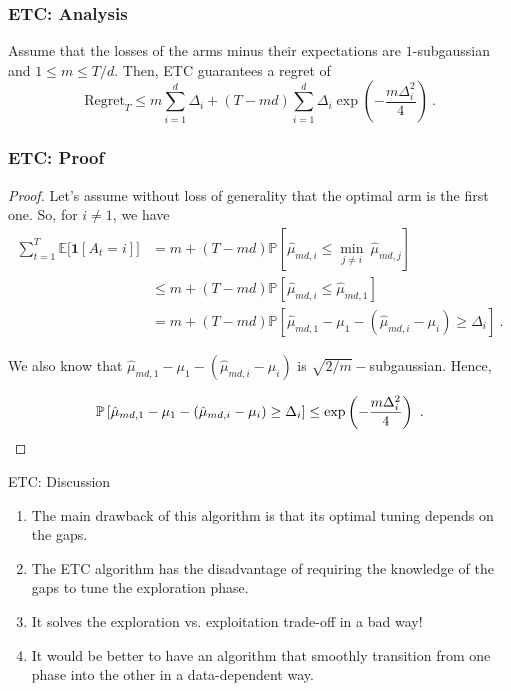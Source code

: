 \documentclass{beamer}
\begin{document}
\begin{frame}
\frametitle{ETC: Analysis}
\begin{theorem}
Assume that the losses of the arms minus their expectations are $1$-subgaussian and $1\leq m \leq T/d$. Then, ETC guarantees a regret of
\[
\mathrm{Regret}_T
\leq m \sum_{i=1}^d \Delta_i + (T-md)\sum_{i=1}^d \Delta_i \exp\left(-\frac{m \Delta^2_i}{4}\right)~.
\]
\end{theorem}

\end{frame}

\begin{frame}
\frametitle{ETC: Proof}
\begin{proof}
Let's assume without loss of generality that the optimal arm is the first one. So, for $i\neq 1$, we have
\begin{align*}
\sum_{t=1}^T \mathbb{E}\big[\boldsymbol{1}[A_t=i]\big]
&= m + (T-m d) \mathbb{P}\left[\hat{\mu}_{md,i} \leq \min_{j\neq i} \ \hat{\mu}_{md,j}\right] \\
&\leq m + (T-m d) \mathbb{P}\left[\hat{\mu}_{md,i} \leq \hat{\mu}_{md,1}\right]\\
&=m + (T-m d) \mathbb{P}\left[\hat{\mu}_{md,1}-\mu_1-(\hat{\mu}_{md,i} -\mu_i)\geq \Delta_i\right]~.
\end{align*}
\pause

We also know that $\hat{\mu}_{md,1}-\mu_1-(\hat{\mu}_{md,i} -\mu_i)$ is $\sqrt{2/m}-$subgaussian. Hence,

\[
\mathbb{P}\left[\hat{\mu}_{md,1}-\mu_1-(\hat{\mu}_{md,i} -\mu_i) \geq \Delta_i\right] 
\leq \exp\left(-\frac{m \Delta^2_i}{4}\right)~. \qedhere
\]

\end{proof}

\end{frame}



\begin{frame}{ETC: Discussion}

\begin{enumerate}
\item The main drawback of this algorithm is that its optimal tuning depends on the gaps.

\pause
\item The ETC algorithm has the disadvantage of requiring the knowledge of the gaps to tune the exploration phase.

\pause
\item 	It solves the exploration vs. exploitation trade-off in a bad way!

\pause
\item
It would be better to have an algorithm that smoothly transition from one phase into the other in a data-dependent way. 

\end{enumerate}

\end{frame}
\end{document}
